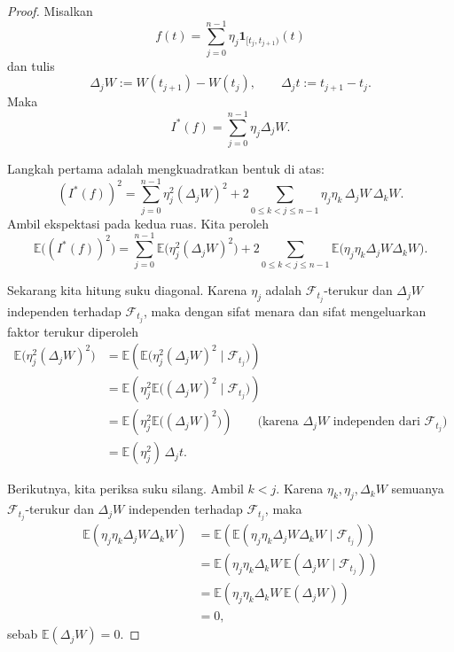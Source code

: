 \documentclass[12pt,a4paper]{article}
\theoremstyle{definition}
\theoremstyle{plain}
\newcommand{\E}{\mathbb{E}}
\newcommand{\F}{\mathcal{F}}
\newcommand{\ind}{\mathbf{1}}
\begin{document}
\begin{proof}
  Misalkan
  \[
    f(t)=\sum_{j=0}^{n-1}\eta_j\ind_{[t_j,t_{j+1})}(t)
  \]
  dan tulis
  \[
    \Delta_jW:=W(t_{j+1})-W(t_j),
    \qquad
    \Delta_jt:=t_{j+1}-t_j.
  \]
  Maka
  \[
    I^\ast(f)=\sum_{j=0}^{n-1}\eta_j\Delta_jW.
  \]

  Langkah pertama adalah mengkuadratkan bentuk di atas:
  \[
    (I^\ast(f))^2
    =
    \sum_{j=0}^{n-1}\eta_j^2(\Delta_jW)^2
    +
    2\sum_{0\le k<j\le n-1}\eta_j\eta_k\,\Delta_jW\,\Delta_kW.
  \]
  Ambil ekspektasi pada kedua ruas. Kita peroleh
  \begin{equation}
    \label{eq:isometri-awal}
    \E\bigl((I^\ast(f))^2\bigr)
    =
    \sum_{j=0}^{n-1}\E\bigl(\eta_j^2(\Delta_jW)^2\bigr)
    +
    2\sum_{0\le k<j\le n-1}\E\bigl(\eta_j\eta_k\Delta_jW\Delta_kW\bigr).
  \end{equation}

  Sekarang kita hitung suku diagonal. Karena $\eta_j$ adalah
  $\F_{t_j}$-terukur dan $\Delta_jW$ independen terhadap $\F_{t_j}$, maka
  dengan sifat menara dan sifat mengeluarkan faktor terukur diperoleh
  \begin{align*}
    \E\bigl(\eta_j^2(\Delta_jW)^2\bigr)
     & =
    \E\left(
    \E\bigl(\eta_j^2(\Delta_jW)^2\mid\F_{t_j}\bigr)
    \right)                                                \\
     & =
    \E\left(
    \eta_j^2\E\bigl((\Delta_jW)^2\mid\F_{t_j}\bigr)
    \right)                                                \\
     & =
    \E\left(
    \eta_j^2\E\bigl((\Delta_jW)^2\bigr)
    \right)
    \qquad
    \text{(karena $\Delta_jW$ independen dari $\F_{t_j}$)} \\
     & =
    \E(\eta_j^2)\,\Delta_jt.
  \end{align*}

  Berikutnya, kita periksa suku silang. Ambil $k<j$. Karena
  $\eta_k,\eta_j,\Delta_kW$ semuanya $\F_{t_j}$-terukur dan $\Delta_jW$
  independen terhadap $\F_{t_j}$, maka
  \begin{align*}
    \E(\eta_j\eta_k\Delta_jW\Delta_kW)
     & =
    \E\left(
    \E(\eta_j\eta_k\Delta_jW\Delta_kW\mid\F_{t_j})
    \right) \\
     & =
    \E\left(
    \eta_j\eta_k\Delta_kW\,\E(\Delta_jW\mid\F_{t_j})
    \right) \\
     & =
    \E\left(
    \eta_j\eta_k\Delta_kW\,\E(\Delta_jW)
    \right) \\
     & =0,
  \end{align*}
  sebab $\E(\Delta_jW)=0$.


\end{proof}
\end{document}
